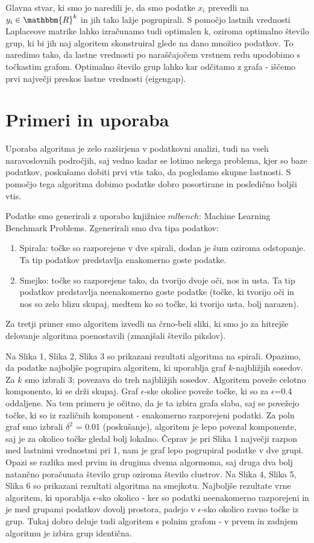 \documentclass[a4paper, 10pt]{article}
\begin{document}
Glavna stvar, ki smo jo naredili je, da smo podatke $x_i$ prevedli na $y_i\in \mathbbm{R}^{k}$ in jih tako lažje pogrupirali. S pomočjo lastnih vrednosti Laplaceove matrike lahko izračunamo tudi optimalen k, oziroma optimalno število grup, ki bi jih naj algoritem skonstruiral glede na dano množico podatkov. To naredimo tako, da lastne vrednosti po naraščajočem vrstnem redu upodobimo s točkastim grafom. Optimalno število grup lahko kar odčitamo z grafa - iščemo prvi največji preskos lastne vrednosti (eigengap).

\section{Primeri in uporaba}

Uporaba algoritma je zelo razširjena v podatkovni analizi, tudi na vseh naravoslovnih področjih, saj vedno kadar se lotimo nekega problema, kjer so baze podatkov, poskušamo dobiti prvi vtis tako, da pogledamo skupne lastnosti. S pomočjo tega algoritma dobimo podatke dobro posortirane in posledično boljši vtis. 

Podatke smo generirali z uporabo knjižnice $mlbench$: Machine Learning Benchmark Problems. Zgenerirali smo dva tipa podatkov:
\begin{enumerate}
\item Spirala: točke so razporejene v dve spirali, dodan je šum oziroma odstopanje. Ta tip podatkov predstavlja enakomerno goste podatke.
\item Smejko: točke so razporejene tako, da tvorijo dvoje oči, nos in usta. Ta tip podatkov predstavlja neenakomerno goste podatke (točke, ki tvorijo oči in nos so zelo blizu skupaj, medtem ko so točke, ki tvorijo usta, bolj narazen).
\end{enumerate}
Za tretji primer smo algoritem izvedli na črno-beli sliki, ki smo jo za hitrejše delovanje algoritma poenostavili (zmanjšali število pikslov). 

Na Slika 1, Slika 2, Slika 3 so prikazani rezultati algoritma na spirali. Opazimo, da podatke najboljše pogrupira algoritem, ki uporablja graf $k$-najbližjih sosedov. Za $k$ smo izbrali 3; povezava do treh najbližjih sosedov. Algoritem poveže celotno komponento, ki se drži skupaj. Graf $\epsilon$-ske okolice poveže točke, ki so za $\epsilon$=0.4 oddaljene. Na tem primeru je očitno, da je ta izbira grafa slaba, saj se povežejo točke, ki so iz različnih komponent - enakomerno razporejeni podatki. Za poln graf smo izbrali $\delta^2$ = 0.01 (poskušanje), algoritem je lepo povezal komponente, saj je za okolico točke gledal bolj lokalno. Čeprav je pri Slika 1 največji razpon med lastnimi vrednostmi pri 1, nam je graf lepo pogrupiral podatke v dve grupi. Opazi se razlika med prvim in drugima dvema algormoma, saj druga dva bolj natančno poračunata število grup oziroma število clustrov.
Na Slika 4, Slika 5, Slika 6 so prikazani rezultati algoritma na smejkotu. Najboljše rezultate vrne algoritem, ki uporablja $\epsilon$-sko okolico - ker so podatki neenakomerno razporejeni in je med grupami podatkov dovolj prostora, padejo v $\epsilon$-sko okolico ravno točke iz grup. Tukaj dobro deluje tudi algoritem s polnim grafom - v prvem in zadnjem algoritmu je izbira grup identična.
\end{document}
